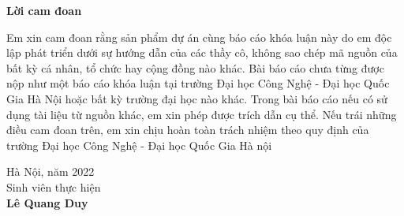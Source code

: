 \setcounter{page}{1}
\begin{center}
\textbf{\large{Lời cam đoan}	}
\end{center}
Em xin cam đoan rằng sản phẩm dự án cùng báo cáo khóa luận này do em độc
lập phát triển dưới sự hướng dẫn của các thầy cô, không sao chép mã nguồn của bất
kỳ cá nhân, tổ chức hay cộng đồng nào khác. Bài báo cáo chưa từng được nộp như
một báo cáo khóa luận tại trường Đại học Công Nghệ - Đại học Quốc Gia Hà Nội
hoặc bất kỳ trường đại học nào khác.
Trong bài báo cáo nếu có sử dụng tài liệu từ nguồn khác, em xin phép được
trích dẫn cụ thể.
Nếu trái những điều cam đoan trên, em xin chịu hoàn toàn trách nhiệm theo
quy định của trường Đại học Công Nghệ - Đại học Quốc Gia Hà nội

\vspace{1cm}
\begin{flushright}
    Hà Nội, năm 2022\\
    Sinh viên thực hiện\\[0.5cm]
    \textbf{Lê Quang Duy}
\end{flushright}
